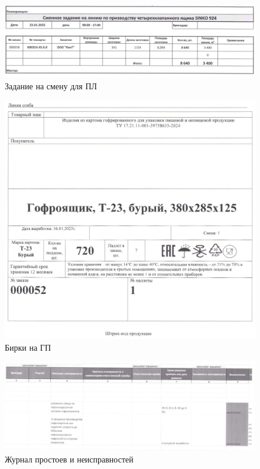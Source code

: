 \begin{figure}
\begin{center}
 \includegraphics[width=\linewidth, height=0.94\textheight, keepaspectratio]{Pics/f24.jpg}
\end{center}
\caption{Задание на смену для ПЛ}
\label{pic:f24}
\end{figure}

\begin{figure}
\begin{center}
 \includegraphics[width=\linewidth, height=0.94\textheight, keepaspectratio]{Pics/f30.jpg}
\end{center}
\caption{Бирки на ГП}
\label{pic:f30}
\end{figure}

\begin{figure}
\begin{center}
\includegraphics[height=0.94\textheight, width=\textwidth, angle=90, keepaspectratio]{Pics/f28.jpg}
\end{center}
\caption{Журнал простоев и неисправностей}
\label{pic:f28}
\end{figure}

